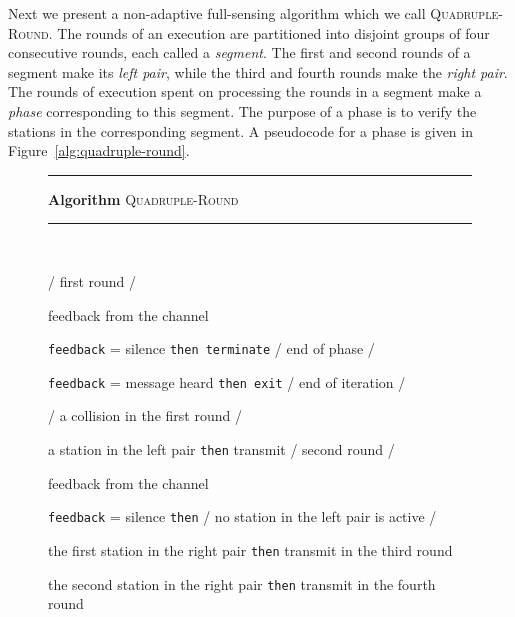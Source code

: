 \documentclass[11pt]{article}
\newcommand{\F}{\vspace*{\smallskipamount}}
\newcommand{\B}{\vspace*{-\smallskipamount}}
\newcommand{\Item}{\B\item}
\newlength{\pagewidth}
\begin{document}
Next we present a non-adaptive full-sensing algorithm which we call \textsc{Quadruple-Round}.
The rounds of an execution are partitioned into disjoint groups of four consecutive rounds, each called a \emph{segment}.
The first and second rounds of a segment make its \emph{left pair}, while the third and fourth rounds make the \emph{right pair}.
The rounds of execution spent on processing the rounds in a segment make a  \emph{phase} corresponding to this segment.
The purpose of a phase is to verify the stations in the corresponding segment.
A pseudocode for a phase is given in Figure~\ref{alg:quadruple-round}.




\begin{figure}[t]
\rule{\textwidth}{0.75pt}

\F 
\textbf{Algorithm} \textsc{Quadruple-Round} 

\rule{\textwidth}{0.75pt}
\begin{center}
\begin{minipage}{\pagewidth}

\begin{description}

\Item[\tt repeat] ~
\B
\begin{description}

\Item[\rm transmit] / first round /

\Item[\tt feedback]  feedback from the channel 

\Item[\tt if] \texttt{feedback} = silence \texttt{then terminate} / end of phase /

\Item[\tt else if] \texttt{feedback} = message heard  \texttt{then exit} / end of iteration /

\Item[\tt else] / a collision in the first round /

\begin{description}

\Item[\tt if] a station in the left pair \texttt{then} transmit  / second round /

\Item[\tt feedback]  feedback from the channel 

\Item[\tt if] \texttt{feedback} = silence \texttt{then} / no  station in the left pair is active /

\begin{description}

\Item[\tt if] the first station in the right pair \texttt{then} transmit in the third round

\Item[\tt else if] the second station in the right pair \texttt{then} transmit in the fourth round


\end{description}
\end{description}
\end{description}
\end{description}
\end{minipage}
\end{center}
\end{figure}
\end{document}
